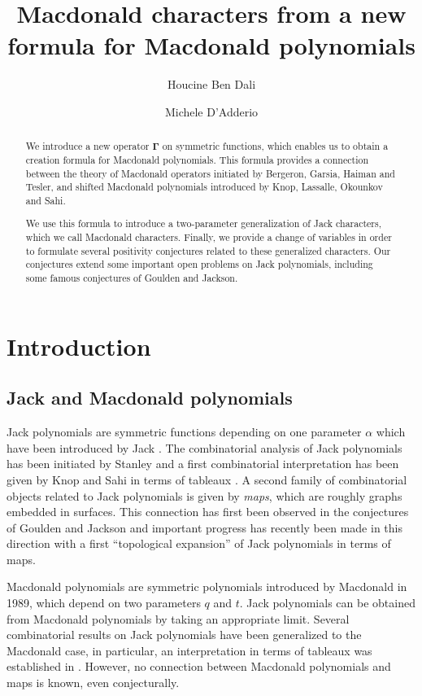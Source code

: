 \documentclass[12pt]{amsart}
\author[H.~Ben Dali]{Houcine Ben Dali}
\author[M.~D'Adderio]{Michele D'Adderio}
\title[Macdonald characters]{Macdonald characters from a new formula for Macdonald polynomials}
\theoremstyle{remark}
\newcommand{\GammaJ}{\boldsymbol{\Gamma}}
\begin{document}
\maketitle
\begin{abstract}
We introduce a new operator $\GammaJ$ on symmetric functions, which enables us to obtain a creation formula for Macdonald polynomials. This formula provides a connection between the theory of Macdonald operators initiated by Bergeron, Garsia, Haiman and Tesler, and shifted Macdonald polynomials introduced by Knop, Lassalle, Okounkov and Sahi.

We use this formula to introduce a two-parameter generalization of Jack characters, which we call Macdonald characters. Finally, we provide a change of variables in order to formulate several positivity conjectures related to these generalized characters. Our conjectures extend some important open problems on Jack polynomials, including some famous conjectures of Goulden and Jackson.
\end{abstract}

\section{Introduction}
\subsection{Jack and Macdonald polynomials}
Jack polynomials are symmetric functions depending on one parameter $\alpha$ which have been introduced by Jack \cite{Jack1970/1971}. 
The combinatorial analysis of Jack polynomials has been initiated by Stanley \cite{Stanley1989}
and a first combinatorial interpretation has been given by Knop and Sahi in terms of tableaux \cite{KnopSahi1997}. 
A second family of combinatorial objects related to Jack polynomials is given by \textit{maps}, which are roughly graphs embedded in surfaces. This connection has first been observed in the conjectures of Goulden and Jackson \cite{GouldenJackson1996} and important progress has recently been made in this direction \cite{ChapuyDolega2022,
BenDaliDolega2023} with a first ``topological expansion'' of Jack polynomials in terms of maps. 

Macdonald polynomials are symmetric polynomials introduced by Macdonald in 1989, which depend on two parameters $q$ and $t$. Jack polynomials can be obtained from Macdonald polynomials by taking an appropriate limit. Several combinatorial results on Jack polynomials have been generalized to the Macdonald case, in particular, an interpretation in terms of tableaux was established in \cite{HaglundHaimanLoehr2005}. However, no connection between Macdonald polynomials and maps is known, even conjecturally. 
\end{document}

